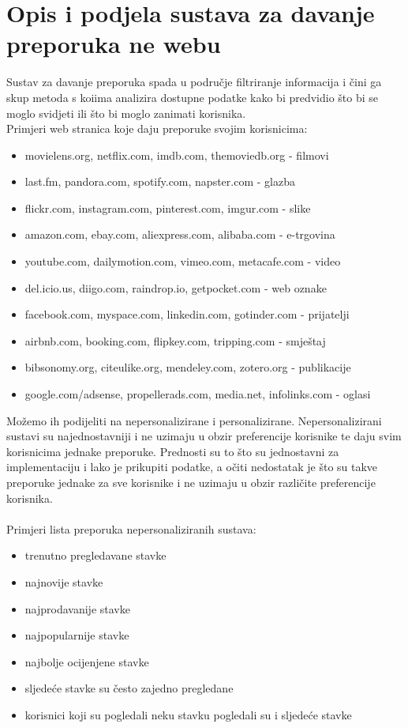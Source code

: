 \documentclass[a4paper,oneside,12pt]{memoir} %
\begin{document}
\chapter{Opis i podjela sustava za davanje preporuka ne webu}	
Sustav za davanje preporuka spada u područje filtriranje informacija i čini ga skup metoda s koiima analizira dostupne podatke kako bi predvidio što bi se moglo svidjeti ili što bi moglo zanimati korisnika.
\bigskip
\\ Primjeri web stranica koje daju preporuke svojim korisnicima:
\begin{itemize}[topsep=2pt]
\setlength{\parskip}{0pt}
\item movielens.org, netflix.com, imdb.com, themoviedb.org - filmovi
\item last.fm, pandora.com, spotify.com, napster.com - glazba
\item flickr.com, instagram.com, pinterest.com, imgur.com - slike
\item amazon.com, ebay.com, aliexpress.com, alibaba.com - e-trgovina
\item youtube.com, dailymotion.com, vimeo.com, metacafe.com - video
\item del.icio.us, diigo.com, raindrop.io, getpocket.com - web oznake 
\item facebook.com, myspace.com, linkedin.com, gotinder.com - prijatelji
\item airbnb.com, booking.com, flipkey.com, tripping.com - smještaj
\item bibsonomy.org, citeulike.org, mendeley.com, zotero.org - publikacije
\item google.com/adsense, propellerads.com, media.net, infolinks.com - oglasi
\end{itemize}
\bigskip
\par
Možemo ih podijeliti na nepersonalizirane i personalizirane. Nepersonalizirani sustavi su najednostavniji i ne uzimaju u obzir preferencije korisnike te daju svim korisnicima jednake preporuke. Prednosti su to što su jednostavni za implementaciju i lako je prikupiti podatke, a očiti nedostatak je što su takve preporuke jednake za sve korisnike i ne uzimaju u obzir različite preferencije korisnika.
\bigskip
\\
\\ Primjeri lista preporuka nepersonaliziranih sustava:
\begin{itemize}[topsep=2pt]
\setlength{\parskip}{0pt}
\item trenutno pregledavane stavke
\item najnovije stavke
\item najprodavanije stavke
\item najpopularnije stavke
\item najbolje ocijenjene stavke
\item sljedeće stavke su često zajedno pregledane
\item korisnici koji su pogledali neku stavku pogledali su i sljedeće stavke
\end{itemize}
\end{document}
